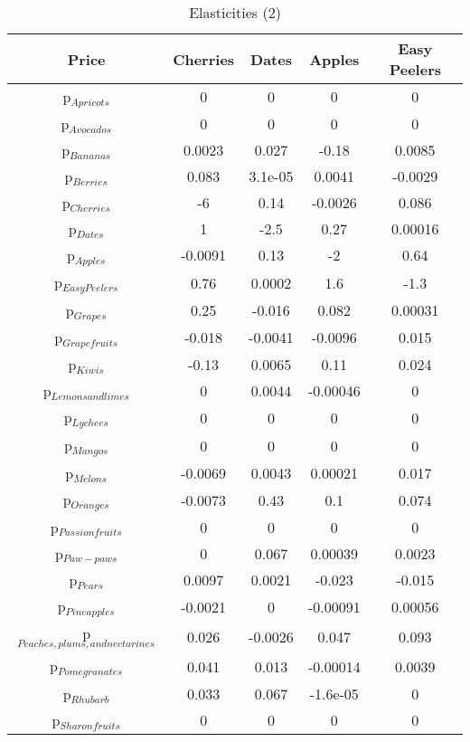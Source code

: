 \documentclass[11pt]{article}
\begin{document}
\begin{table}[h]
\caption{Elasticities (2)}
\label{Table: elasticities 2}
\begin{center}
\begin{tabular}{ccccc}
Price & Cherries & Dates & Apples & Easy Peelers \\ \hline
p$_{Apricots}$ & 0 & 0 & 0 & 0 \\ 
p$_{Avocados}$ & 0 & 0 & 0 & 0 \\ 
p$_{Bananas}$ & 0.0023 & 0.027 & -0.18 & 0.0085 \\ 
p$_{Berries}$ & 0.083 & 3.1e-05 & 0.0041 & -0.0029 \\ 
p$_{Cherries}$ & -6 & 0.14 & -0.0026 & 0.086 \\ 
p$_{Dates}$ & 1 & -2.5 & 0.27 & 0.00016 \\ 
p$_{Apples}$ & -0.0091 & 0.13 & -2 & 0.64 \\ 
p$_{Easy Peelers}$ & 0.76 & 0.0002 & 1.6 & -1.3 \\ 
p$_{Grapes}$ & 0.25 & -0.016 & 0.082 & 0.00031 \\ 
p$_{Grapefruits}$ & -0.018 & -0.0041 & -0.0096 & 0.015 \\ 
p$_{Kiwis}$ & -0.13 & 0.0065 & 0.11 & 0.024 \\ 
p$_{Lemons and limes}$ & 0 & 0.0044 & -0.00046 & 0 \\ 
p$_{Lychees}$ & 0 & 0 & 0 & 0 \\ 
p$_{Mangos}$ & 0 & 0 & 0 & 0 \\ 
p$_{Melons}$ & -0.0069 & 0.0043 & 0.00021 & 0.017 \\ 
p$_{Oranges}$ & -0.0073 & 0.43 & 0.1 & 0.074 \\ 
p$_{Passion fruits}$ & 0 & 0 & 0 & 0 \\ 
p$_{Paw-paws}$ & 0 & 0.067 & 0.00039 & 0.0023 \\ 
p$_{Pears}$ & 0.0097 & 0.0021 & -0.023 & -0.015 \\ 
p$_{Pineapples}$ & -0.0021 & 0 & -0.00091 & 0.00056 \\ 
p$_{Peaches, plums, and nectarines}$ & 0.026 & -0.0026 & 0.047 & 0.093 \\ 
p$_{Pomegranates}$ & 0.041 & 0.013 & -0.00014 & 0.0039 \\ 
p$_{Rhubarb}$ & 0.033 & 0.067 & -1.6e-05 & 0 \\ 
p$_{Sharon fruits}$ & 0 & 0 & 0 & 0 \\ 
\end{tabular}
\end{center}
\end{table}
\end{document}
